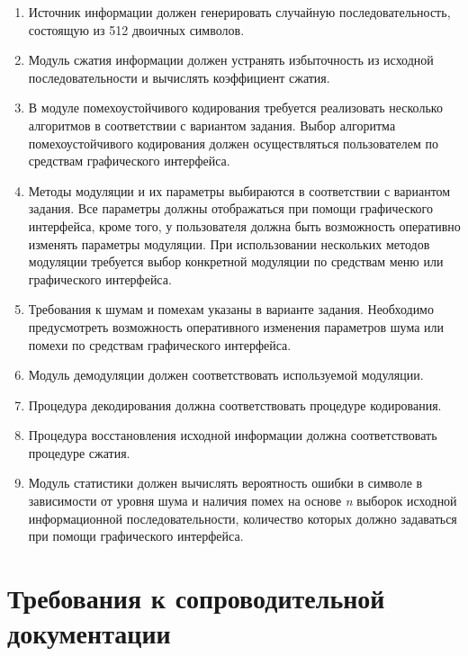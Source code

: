 \begin{enumerate}
\item	Источник информации должен генерировать случайную последовательность, состоящую из 512 двоичных символов.

\item	Модуль сжатия информации должен устранять избыточность из исходной последовательности и вычислять коэффициент сжатия.

\item	В модуле помехоустойчивого кодирования требуется реализовать несколько алгоритмов в соответствии с вариантом задания. Выбор алгоритма помехоустойчивого кодирования должен осуществляться пользователем по средствам графического интерфейса.

\item	Методы модуляции и их параметры выбираются в соответствии с вариантом задания. Все параметры должны отображаться при помощи графического интерфейса, кроме того, у пользователя должна быть возможность оперативно изменять параметры модуляции.  При использовании нескольких методов модуляции требуется выбор конкретной модуляции по средствам меню или графического интерфейса.

\item	Требования к шумам и помехам указаны в варианте задания. Необходимо предусмотреть возможность оперативного изменения параметров шума или помехи по средствам графического интерфейса.

\item	Модуль демодуляции должен соответствовать  используемой модуляции.

\item	Процедура декодирования должна соответствовать процедуре кодирования.

\item	Процедура восстановления исходной информации должна соответствовать процедуре сжатия.

\item	Модуль статистики должен вычислять вероятность ошибки в символе в зависимости от уровня шума и наличия помех на основе \textit{n} выборок исходной информационной последовательности, количество которых должно задаваться при помощи графического интерфейса.
\end{enumerate}

\section{Требования к сопроводительной документации}

